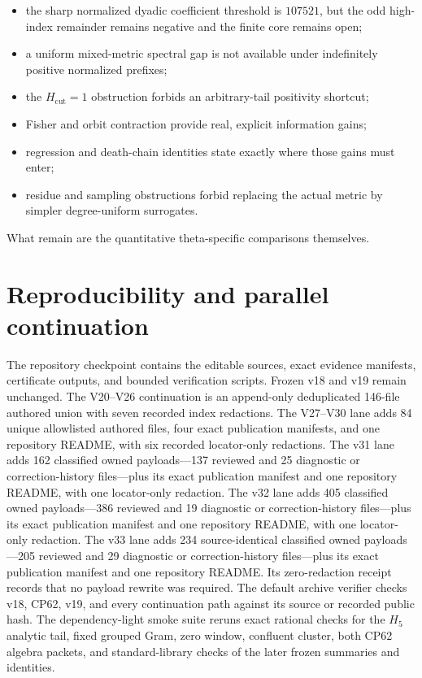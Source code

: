 \documentclass[11pt]{article}
\theoremstyle{definition}
\theoremstyle{remark}
\begin{document}
\begin{itemize}
\item the sharp normalized dyadic coefficient threshold is $107521$, but the
  odd high-index remainder remains negative and the finite core remains open;
\item a uniform mixed-metric spectral gap is not available under indefinitely
  positive normalized prefixes;
\item the $H_{\mathrm{cut}}=1$ obstruction forbids an arbitrary-tail positivity shortcut;
\item Fisher and orbit contraction provide real, explicit information gains;
\item regression and death-chain identities state exactly where those gains
  must enter;
\item residue and sampling obstructions forbid replacing the actual metric by
  simpler degree-uniform surrogates.
\end{itemize}
What remain are the quantitative theta-specific comparisons themselves.

\section{Reproducibility and parallel continuation}

The repository checkpoint contains the editable sources, exact evidence
manifests, certificate outputs, and bounded verification scripts. Frozen v18
and v19 remain unchanged. The V20--V26 continuation is an append-only
deduplicated 146-file authored union with seven recorded index redactions. The
V27--V30 lane adds 84 unique allowlisted authored files, four exact publication
manifests, and one repository README, with six recorded locator-only
redactions. The v31 lane adds 162 classified owned payloads---137 reviewed and
25 diagnostic or correction-history files---plus its exact publication
manifest and one repository README, with one locator-only redaction. The v32
lane adds 405 classified owned payloads---386 reviewed and 19 diagnostic or
correction-history files---plus its exact publication manifest and one
repository README, with one locator-only redaction. The v33 lane adds 234
source-identical classified owned payloads---205 reviewed and 29 diagnostic or
correction-history files---plus its exact publication manifest and one
repository README. Its zero-redaction receipt records that no payload rewrite
was required. The
default archive verifier checks v18, CP62, v19, and every
continuation path against its source or recorded public hash. The
dependency-light smoke suite reruns exact rational checks for the $H_5$
analytic tail, fixed grouped Gram, zero window, confluent cluster, both CP62
algebra packets, and standard-library checks of the later frozen summaries and
identities.
\end{document}
